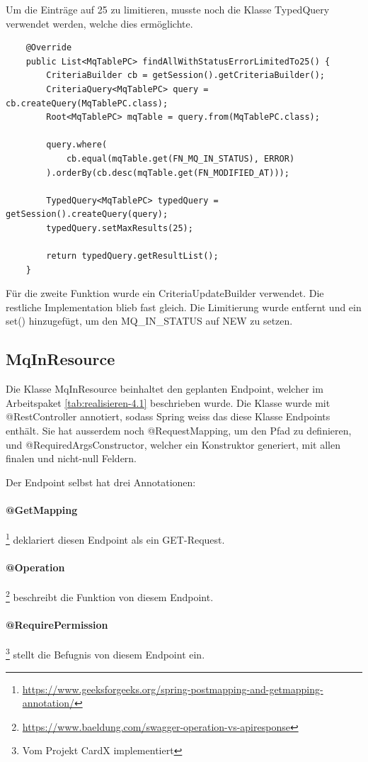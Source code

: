 Um die Einträge auf 25 zu limitieren, musste noch die Klasse TypedQuery verwendet werden, welche dies ermöglichte.

\begin{verbatim}
	@Override
	public List<MqTablePC> findAllWithStatusErrorLimitedTo25() {
		CriteriaBuilder cb = getSession().getCriteriaBuilder();
		CriteriaQuery<MqTablePC> query = cb.createQuery(MqTablePC.class);
		Root<MqTablePC> mqTable = query.from(MqTablePC.class);
		
		query.where(
			cb.equal(mqTable.get(FN_MQ_IN_STATUS), ERROR)
		).orderBy(cb.desc(mqTable.get(FN_MODIFIED_AT)));
		
		TypedQuery<MqTablePC> typedQuery = getSession().createQuery(query);
		typedQuery.setMaxResults(25);
		
		return typedQuery.getResultList();
	}
\end{verbatim}

\noindent Für die zweite Funktion wurde ein CriteriaUpdateBuilder verwendet. Die restliche Implementation blieb fast gleich. Die Limitierung wurde entfernt und ein set() hinzugefügt, um den MQ\_IN\_STATUS auf NEW zu setzen.

\subsection{MqInResource}
Die Klasse MqInResource beinhaltet den geplanten Endpoint, welcher im Arbeitspaket \ref{tab:realisieren-4.1} beschrieben wurde. Die Klasse wurde mit @RestController annotiert, sodass Spring weiss das diese Klasse Endpoints enthält. Sie hat ausserdem noch @RequestMapping, um den Pfad zu definieren, und @RequiredArgsConstructor, welcher ein Konstruktor generiert, mit allen finalen und nicht-null Feldern.

Der Endpoint selbst hat drei Annotationen:

\paragraph{@GetMapping} \footnote{\url{https://www.geeksforgeeks.org/spring-postmapping-and-getmapping-annotation/}} deklariert diesen Endpoint als ein GET-Request.
\paragraph{@Operation} \footnote{\url{https://www.baeldung.com/swagger-operation-vs-apiresponse}} beschreibt die Funktion von diesem Endpoint.
\paragraph{@RequirePermission} \footnote{Vom Projekt CardX implementiert} stellt die Befugnis von diesem Endpoint ein. \newline

